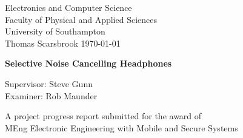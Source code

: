 \begin{titlepage}
\thispagestyle{plain}
\begin{center}

\LARGE{Electronics and Computer Science}\\
\LARGE{Faculty of Physical and Applied Sciences}\\
\LARGE{University of Southampton}\\
\vfill
\normalsize{Thomas Scarsbrook}
\vfill
\normalsize\today

\vfill

\Large{\textbf{Selective Noise Cancelling Headphones}}

\vfill

\normalsize{Supervisor: Steve Gunn}\\
\normalsize{Examiner: Rob Maunder}

\vfill

\large{A project progress report submitted for the award of\\
MEng Electronic Engineering with Mobile and Secure Systems}

\end{center}
\end{titlepage}
